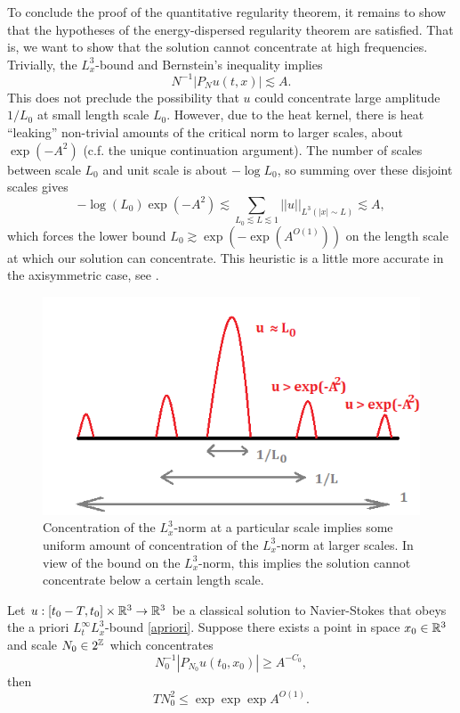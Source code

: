 To conclude the proof of the quantitative regularity theorem, it remains to show that the hypotheses of the energy-dispersed regularity theorem are satisfied. That is, we want to show that the solution cannot concentrate at high frequencies. Trivially, the $L^3_x$-bound and Bernstein's inequality implies 
	\[
		N^{-1} |P_N u (t, x)| \lesssim A.
	\]	
This does not preclude the possibility that $u$ could concentrate large amplitude $1/L_0$ at small length scale $L_0$. However, due to the heat kernel, there is heat ``leaking'' non-trivial amounts of the critical norm to larger scales, about $\exp(- A^2)$ (c.f. the unique continuation argument). The number of scales between scale $L_0$ and unit scale is about $-\log L_0$, so summing over these disjoint scales gives
	\[
		-\log (L_0)\exp(- A^2)\lesssim \sum_{L_0 \lesssim L\lesssim 1} ||u||_{L^3 (|x| \sim L)} \lesssim A,
	\]
which forces the lower bound $L_0 \gtrsim \exp (- \exp ( A^{O(1)}))$ on the length scale at which our solution can concentrate. This heuristic is a little more accurate in the axisymmetric case, see \cite{Palasek2021}.

\begin{figure}[h]
	\begin{center}
		\includegraphics{graphics/heuristic}
		\caption{Concentration of the $L^3_x$-norm at a particular scale implies some uniform amount of concentration of the $L^3_x$-norm at larger scales. In view of the bound on the $L^3_x$-norm, this implies the solution cannot concentrate below a certain length scale. }
	\end{center}
\end{figure}


\begin{theorem}
	Let $u: [t_0 - T, t_0] \times \mathbb R^3 \to \mathbb R^3$ be a classical solution to Navier-Stokes that obeys the a priori $L^\infty_t L^3_x$-bound \eqref{apriori}. Suppose there exists a point in space $x_0 \in \mathbb R^3$ and scale $N_0 \in 2^\mathbb Z$ which concentrates 
		\begin{equation}
			N^{-1}_0 |P_{N_0} u(t_0, x_0)| \geq A^{-C_0} ,
			\label{eq:concentration}
		\end{equation}
	then
		\begin{equation}
			TN_0^2 \leq \exp \exp \exp A^{O(1)}. \label{eq:exp}
		\end{equation}		
\end{theorem}

